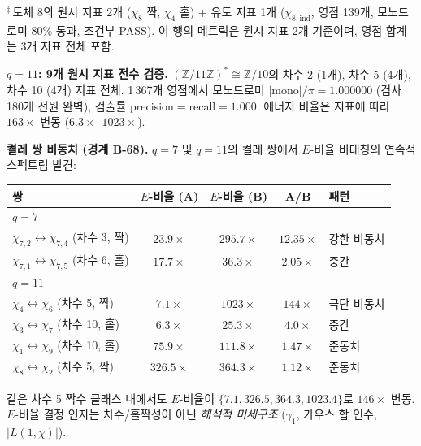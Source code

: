 \documentclass[11pt, a4paper]{article}
\theoremstyle{definition}
\theoremstyle{plain}
\begin{document}
\noindent
${}^\ddagger$\,도체 8의 원시 지표 2개 ($\chi_8$ 짝, $\chi_4$ 홀) + 유도 지표 1개
($\chi_{8,\mathrm{ind}}$, 영점 139개, 모노드로미 80\% 통과, 조건부 PASS).
이 행의 메트릭은 원시 지표 2개 기준이며, 영점 합계는 3개 지표 전체 포함.

\smallskip\noindent
\textbf{$q = 11$: 9개 원시 지표 전수 검증.}
$(\mathbb{Z}/11\mathbb{Z})^*\cong\mathbb{Z}/10$의 차수 2 (1개), 차수 5 (4개), 차수 10 (4개) 지표 전체.
1\,367개 영점에서 모노드로미 $|\mathrm{mono}|/\pi = 1.000000$ (검사 180개 전원 완벽),
검출률 precision${=}$recall${=}1.000$.
에너지 비율은 지표에 따라 $163\times$ 변동 ($6.3\times$--$1023\times$).

\smallskip\noindent
\textbf{켤레 쌍 비동치 (경계 B-68).}
$q{=}7$ 및 $q{=}11$의 켤레 쌍에서 $E$-비율 비대칭의 연속적 스펙트럼 발견:

\begin{center}
\small
\begin{tabular}{lcccl}
\toprule
쌍 & $E$-비율 (A) & $E$-비율 (B) & A/B & 패턴 \\
\midrule
\multicolumn{5}{l}{\textit{$q=7$}} \\
$\chi_{7,2} \leftrightarrow \chi_{7,4}$ (차수 3, 짝) & $23.9\times$ & $295.7\times$ & $12.35\times$ & 강한 비동치 \\
$\chi_{7,1} \leftrightarrow \chi_{7,5}$ (차수 6, 홀) & $17.7\times$ & $36.3\times$ & $2.05\times$ & 중간 \\
\midrule
\multicolumn{5}{l}{\textit{$q=11$}} \\
$\chi_4 \leftrightarrow \chi_6$ (차수 5, 짝) & $7.1\times$ & $1023\times$ & $144\times$ & 극단 비동치 \\
$\chi_3 \leftrightarrow \chi_7$ (차수 10, 홀) & $6.3\times$ & $25.3\times$ & $4.0\times$ & 중간 \\
$\chi_1 \leftrightarrow \chi_9$ (차수 10, 홀) & $75.9\times$ & $111.8\times$ & $1.47\times$ & 준동치 \\
$\chi_8 \leftrightarrow \chi_2$ (차수 5, 짝) & $326.5\times$ & $364.3\times$ & $1.12\times$ & 준동치 \\
\bottomrule
\end{tabular}
\end{center}

\noindent
같은 차수 5 짝수 클래스 내에서도 $E$-비율이 $\{7.1, 326.5, 364.3, 1023.4\}$로
$146\times$ 변동. $E$-비율 결정 인자는 차수/홀짝성이 아닌
\emph{해석적 미세구조} ($\gamma_1$, 가우스 합 인수, $|L(1,\chi)|$).
\end{document}
